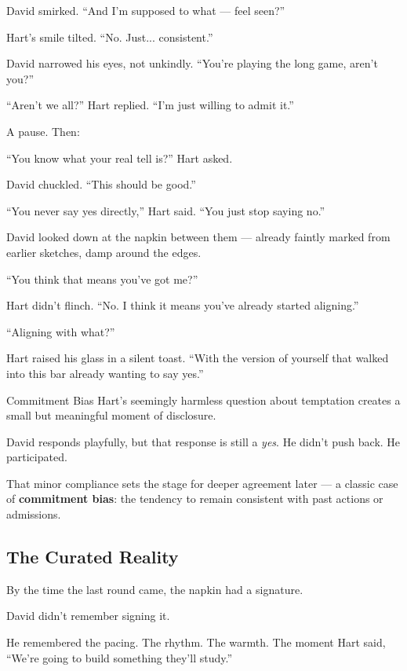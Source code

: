 David smirked. “And I’m supposed to what — feel seen?”

Hart’s smile tilted. “No. Just... consistent.”

David narrowed his eyes, not unkindly. “You’re playing the long game, aren’t you?”

“Aren’t we all?” Hart replied. “I’m just willing to admit it.”

A pause. Then:

“You know what your real tell is?” Hart asked.

David chuckled. “This should be good.”

“You never say yes directly,” Hart said. “You just stop saying no.”

David looked down at the napkin between them — already faintly marked from earlier sketches, damp around the edges.

“You think that means you’ve got me?”

Hart didn’t flinch. “No. I think it means you’ve already started aligning.”

“Aligning with what?”

Hart raised his glass in a silent toast. “With the version of yourself that walked into this bar already wanting to say yes.”

\begin{PsychologicalSidebar}{Commitment Bias}
Hart's seemingly harmless question about temptation creates a small but meaningful moment of disclosure.

David responds playfully, but that response is still a \textit{yes}. He didn’t push back. He participated.

That minor compliance sets the stage for deeper agreement later — a classic case of \textbf{commitment bias}: 
the tendency to remain consistent with past actions or admissions.
\end{PsychologicalSidebar}



\subsection{The Curated Reality}


By the time the last round came, the napkin had a signature.

David didn’t remember signing it.

He remembered the pacing. The rhythm. The warmth.
The moment Hart said, “We’re going to build something they’ll study.”

